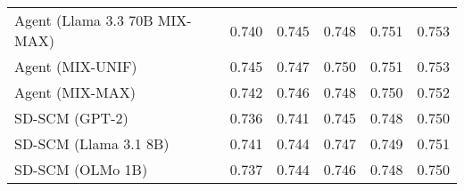 \begin{table}[h!]
\begin{tabular}{lccccc}
    Agent (Llama 3.3 70B MIX-MAX) & 0.740 & 0.745 & 0.748 & \cellcolor{bronze!30}0.751 & \cellcolor{silver!30}0.753 \\
    Agent (MIX-UNIF) & \cellcolor{silver!30}0.745 & \cellcolor{silver!30}0.747 & \cellcolor{silver!30}0.750 & \cellcolor{bronze!30}0.751 & \cellcolor{silver!30}0.753 \\
    Agent (MIX-MAX) & 0.742 & \cellcolor{bronze!30}0.746 & 0.748 & 0.750 & \cellcolor{bronze!30}0.752 \\
    \arrayrulecolor{black!50!}\midrule
    SD-SCM (GPT-2) & 0.736 & 0.741 & 0.745 & 0.748 & 0.750 \\
    SD-SCM (Llama 3.1 8B) & 0.741 & 0.744 & 0.747 & 0.749 & 0.751 \\
    SD-SCM (OLMo 1B) & 0.737 & 0.744 & 0.746 & 0.748 & 0.750 \\
    \bottomrule
    \end{tabular}
\end{table}